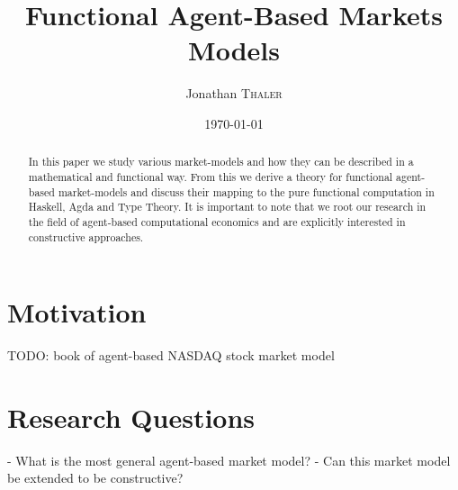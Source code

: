 \documentclass{article}
\title{Functional Agent-Based Markets Models} %
\author{Jonathan \textsc{Thaler}} %
\date{\today} %
\begin{document}
\maketitle %

\begin{abstract}
In this paper we study various market-models and how they can be described in a mathematical and functional way. From this we derive a theory for functional agent-based market-models and discuss their mapping to the pure functional computation in Haskell, Agda and Type Theory. It is important to note that we root our research in the field of agent-based computational economics and are explicitly interested in constructive approaches.
\end{abstract}

\section{Motivation}
TODO: book of agent-based NASDAQ stock market model

\section{Research Questions}
- What is the most general agent-based market model?
- Can this market model be extended to be constructive?



\end{document}
